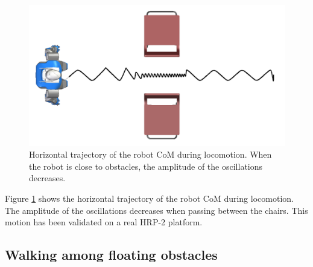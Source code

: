 \begin{figure}
\centering
\includegraphics[width=0.7\linewidth]
                {src/chap2-wholebody-planning/pics/chairs/waist-trajectory.png}

\caption{Horizontal trajectory of the robot CoM during
  locomotion. When the robot is close to obstacles, the amplitude of
  the oscillations decreases.}
\label{fig:chairs-waist}
\end{figure}

Figure  \ref{fig:chairs-waist} shows the horizontal trajectory of the
robot CoM during locomotion. The amplitude of the oscillations
decreases when passing between the chairs.  This motion has been
validated on a real HRP-2 platform.

\subsection{Walking among floating obstacles}


